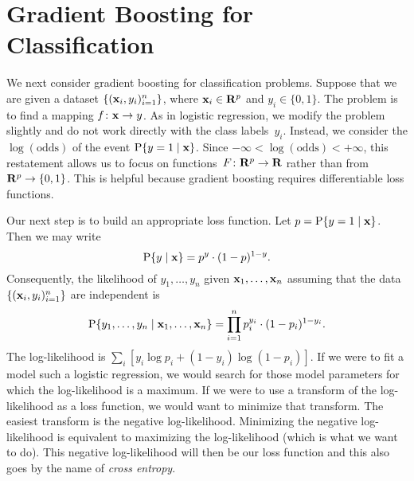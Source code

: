 \section{Gradient Boosting for Classification}

We next consider gradient boosting for classification problems. Suppose that 
we are given a dataset $\{(\mathbf{x}_i, y_i)_{i = 1}^{n}\}$, where 
$\mathbf{x}_i \in \mathbf{R}^p$ and $y_i \in \{0, 1\}$. The problem is to find a mapping 
$f \colon \mathbf{x} \to y$. As in logistic regression, we modify the problem 
slightly and do not work directly with the class labels~$y_i$. Instead, we 
consider the $\log (\text{odds})$ of the event $\operatorname{P} \{y = 1 \mid \mathbf{x} \}$. 
Since $- \infty < \log (\text{odds}) < + \infty$, this restatement allows us 
to focus on functions~$F \colon \mathbf{R}^p \to \mathbf{R}$ rather than from 
$\mathbf{R}^p \to \{0, 1\}$. This is helpful because gradient boosting requires 
differentiable loss functions. 

Our next step is to build an appropriate loss function. Let 
$p = \operatorname{P} \{y = 1 \mid \mathbf{x} \}$. Then we may write
\begin{equation}
    \operatorname{P} \{y \mid \mathbf{x} \} = p^y \cdot (1 - p)^{1 - y}.
\end{equation} 
Consequently, the likelihood of $y_1, \ldots, y_n$ given 
$\mathbf{x}_1, \ldots, \mathbf{x}_n$ assuming that the data 
$\{(\mathbf{x}_i, y_i)_{i = 1}^{n}\}$ are independent is
\begin{equation}
    \operatorname{P} \{y_1, \ldots, y_n \mid \mathbf{x}_1, \ldots, \mathbf{x}_n \} 
        =   \prod_{i = 1}^{n} p_{i}^{y_i} \cdot (1 - p_i)^{1 - y_i}.
\end{equation}
The log-likelihood is $\sum_{i} \left [ y_i \log p_i + (1 - y_i) \log (1 - p_i) \right ]$. 
If we were to fit a model such a logistic regression, we would search for 
those model parameters for which the log-likelihood is a maximum. If we 
were to use a transform of the log-likelihood as a loss function, we would
want to minimize that transform. The easiest transform is the negative 
log-likelihood. Minimizing the negative log-likelihood is equivalent to maximizing
the log-likelihood (which is what we want to do). 
This negative log-likelihood will then be our loss function and this also 
goes by the name of \emph{cross entropy}.
 
